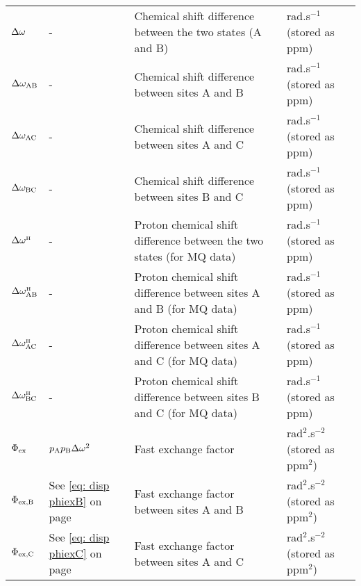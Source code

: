 \begin{landscape}
\begin{center}
\begin{small}
\begin{longtable}{llll}
$\Delta\omega$              & -                              & Chemical shift difference between the two states (A and B)                    & rad.s$^{-1}$ (stored as ppm) \\
$\Delta\omega_\textrm{AB}$            & -                              & Chemical shift difference between sites A and B                               & rad.s$^{-1}$ (stored as ppm) \\
$\Delta\omega_\textrm{AC}$            & -                              & Chemical shift difference between sites A and C                               & rad.s$^{-1}$ (stored as ppm) \\
$\Delta\omega_\textrm{BC}$            & -                              & Chemical shift difference between sites B and C                               & rad.s$^{-1}$ (stored as ppm) \\
$\Delta\omega^{\scriptscriptstyle\mathrm{H}}$             & -                              & Proton chemical shift difference between the two states (for MQ data)         & rad.s$^{-1}$ (stored as ppm) \\
$\Delta\omega^{\scriptscriptstyle\mathrm{H}}_\textrm{AB}$           & -                              & Proton chemical shift difference between sites A and B (for MQ data)          & rad.s$^{-1}$ (stored as ppm) \\
$\Delta\omega^{\scriptscriptstyle\mathrm{H}}_\textrm{AC}$           & -                              & Proton chemical shift difference between sites A and C (for MQ data)          & rad.s$^{-1}$ (stored as ppm) \\
$\Delta\omega^{\scriptscriptstyle\mathrm{H}}_\textrm{BC}$           & -                              & Proton chemical shift difference between sites B and C (for MQ data)          & rad.s$^{-1}$ (stored as ppm) \\
$\Phi_\textrm{ex}$           & $p_\textrm{A}p_\textrm{B}\Delta\omega^2$                  & Fast exchange factor                                                          & rad$^2$.s$^{-2}$ (stored as ppm$^2$) \\
$\Phi_\textrm{ex,B}$          & See \ref{eq: disp phiexB} on page \pageref{eq: disp phiexB} & Fast exchange factor between sites A and B       & rad$^2$.s$^{-2}$ (stored as ppm$^2$) \\
$\Phi_\textrm{ex,C}$          & See \ref{eq: disp phiexC} on page \pageref{eq: disp phiexC} & Fast exchange factor between sites A and C       & rad$^2$.s$^{-2}$ (stored as ppm$^2$) \\

\end{longtable}
\end{small}
\end{center}
\end{landscape}

